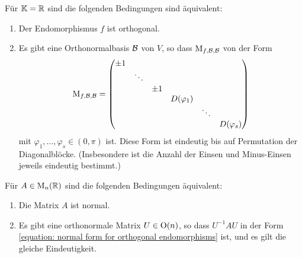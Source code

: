 \begin{theorem}
  Für $\mathbb{K} = \mathbb{R}$ sind die folgenden Bedingungen sind äquivalent:
  \begin{enumerate}
    \item
      Der Endomorphismus $f$ ist orthogonal.
    \item
      Es gibt eine Orthonormalbasis $\mathcal{B}$ von $V$, so dass $\operatorname{M}_{f, \mathcal{B}, \mathcal{B}}$ von der Form
      \begin{equation}
      \label{equation: normal form for orthogonal endomorphisms}
          \operatorname{M}_{f, \mathcal{B}, \mathcal{B}}
        = \begin{pmatrix}
            \pm 1 &         &       &               &         &               \\
                  & \ddots  &       &               &         &               \\
                  &         & \pm 1 &               &         &               \\
                  &         &       & D(\varphi_1)  &         &               \\
                  &         &       &               & \ddots  &               \\
                  &         &       &               &         & D(\varphi_s)
          \end{pmatrix}
      \end{equation}
      mit $\varphi_1, \dotsc, \varphi_s \in (0, \pi)$ ist.
      Diese Form ist eindeutig bis auf Permutation der Diagonalblöcke.
      \textup(Insbesondere ist die Anzahl der Einsen und Minus-Einsen jeweils eindeutig bestimmt.\textup)
  \end{enumerate}
\end{theorem}

\begin{corollary}
  Für $A \in \operatorname{M}_{n}(\mathbb{R})$ sind die folgenden Bedingungen äquivalent:
  \begin{enumerate}
    \item
      Die Matrix $A$ ist normal.
    \item
      Es gibt eine orthonormale Matrix $U \in \operatorname{O}(n)$, so dass $U^{-1} A U$ in der Form \eqref{equation: normal form for orthogonal endomorphisms} ist, und es gilt die gleiche Eindeutigkeit.
  \end{enumerate}
\end{corollary}





